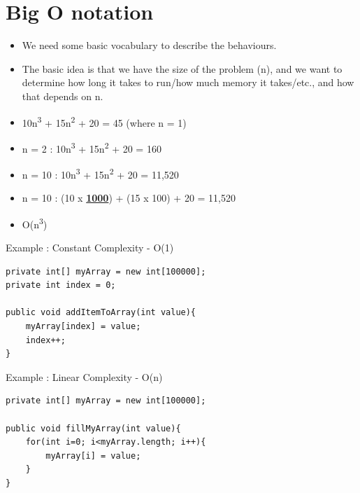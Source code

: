 \documentclass{beamer}
\begin{document}
\section{Big O notation}

\begin{frame}
\begin{itemize}
\item We need some basic vocabulary to describe the behaviours.
\item The basic idea is that we have the size of the problem (n), and we want to determine how long it takes to run/how much memory it takes/etc., and how that depends on n.
\end{itemize}
\end{frame} 

\begin{frame}
\begin{itemize}
\item 10n\textsuperscript{3} + 15n\textsuperscript{2} + 20 = 45 (where n = 1)
\bigskip
\item n = 2 : 10n\textsuperscript{3} + 15n\textsuperscript{2} + 20 = 160
\bigskip
\item n = 10 : 10n\textsuperscript{3} + 15n\textsuperscript{2} + 20 = 11,520
\bigskip
\item n = 10 : (10 x \textbf{\underline{1000}}) + (15 x 100) + 20 = 11,520
\bigskip
\item O(n\textsuperscript{3})
\end{itemize}
\end{frame} 

\begin{frame}[fragile]
Example : Constant Complexity - O(1)
\begin{block}{}
\begin{lstlisting}
private int[] myArray = new int[100000];
private int index = 0;

public void addItemToArray(int value){
    myArray[index] = value;
    index++;
}
\end{lstlisting}
\end{block}
\end{frame} 

\begin{frame}[fragile]
Example : Linear Complexity - O(n)
\begin{block}{}
\begin{lstlisting}
private int[] myArray = new int[100000];

public void fillMyArray(int value){
    for(int i=0; i<myArray.length; i++){
        myArray[i] = value;
    }
}
\end{lstlisting}
\end{block}
\end{frame} 
\end{document}
